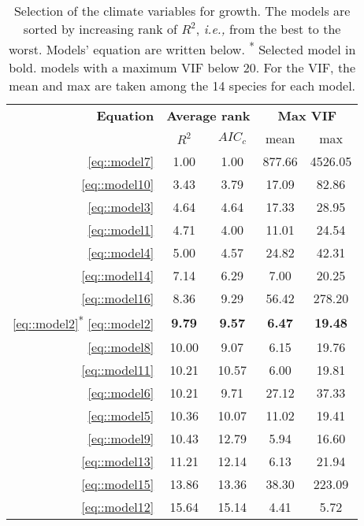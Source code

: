 \documentclass[letterpaper, 12pt]{article}
\newcommand {\ie}{\textit{i.e., }}
\theoremstyle{theo}
\begin{document}
\begin{refsection}
\begin{onehalfspace}
\begin{table}[h!]
\centering
\caption[Selection of the climate variables for growth]{Selection of the climate variables for growth. The models are sorted by increasing rank of $ R^2 $, \ie from the best to the worst. Models' equation are written below. \textsuperscript{*} Selected model in bold. \dag models with a maximum VIF below 20. For the VIF, the mean and max are taken among the 14 species for each model.}
\label{tab::climSelection}
\begin{tabular}{@{}rcccc@{}}
	\toprule
	\textbf{Equation} & \multicolumn{2}{c}{\textbf{Average rank}} & \multicolumn{2}{c}{\textbf{Max VIF}} \\
		\cmidrule(lr){2-3} \cmidrule(lr){4-5}
		& $ R^2 $ & $ AIC_c $ & mean & max \\
	\midrule
	\ref{eq::model7} & 1.00 & 1.00 & 877.66 & 4526.05 \\
	\ref{eq::model10} & 3.43 & 3.79 & 17.09 & 82.86 \\
	\ref{eq::model3} & 4.64 & 4.64 & 17.33 & 28.95 \\
	\ref{eq::model1} & 4.71 & 4.00 & 11.01 & 24.54 \\
	\ref{eq::model4} & 5.00 & 4.57 & 24.82 & 42.31 \\
	\ref{eq::model14} & 7.14 & 6.29 & 7.00 & 20.25 \\
	\ref{eq::model16} & 8.36 & 9.29 & 56.42 & 278.20 \\
	\ref{eq::model2}\textsuperscript{*} \dag \ref{eq::model2} & \textbf{9.79} & \textbf{9.57} & \textbf{6.47} & \textbf{19.48} \\
	\ref{eq::model8} \dag & 10.00 & 9.07 & 6.15 & 19.76 \\
	\ref{eq::model11} \dag & 10.21 & 10.57 & 6.00 & 19.81 \\
	\ref{eq::model6} & 10.21 & 9.71 & 27.12 & 37.33 \\
	\ref{eq::model5} \dag & 10.36 & 10.07 & 11.02 & 19.41 \\
	\ref{eq::model9} \dag & 10.43 & 12.79 & 5.94 & 16.60 \\
	\ref{eq::model13} & 11.21 & 12.14 & 6.13 & 21.94 \\
	\ref{eq::model15} & 13.86 & 13.36 & 38.30 & 223.09 \\
	\ref{eq::model12} \dag & 15.64 & 15.14 & 4.41 & 5.72 \\
	\bottomrule
\end{tabular}
\end{table}


\end{onehalfspace}
\end{refsection}
\end{document}
